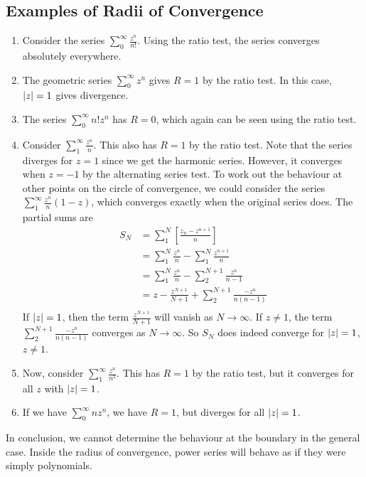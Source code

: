 \subsection{Examples of Radii of Convergence}
\begin{enumerate}
	\item Consider the series \(\sum_0^\infty \frac{z^n}{n!}\).
	      Using the ratio test, the series converges absolutely everywhere.
	\item The geometric series \(\sum_0^\infty z^n\) gives \(R=1\) by the ratio test.
	      In this case, \(\abs{z} = 1\) gives divergence.
	\item The series \(\sum_0^\infty n!z^n\) has \(R=0\), which again can be seen using the ratio test.
	\item Consider \(\sum_1^\infty \frac{z^n}{n}\).
	      This also has \(R = 1\) by the ratio test.
	      Note that the series diverges for \(z=1\) since we get the harmonic series.
	      However, it converges when \(z = -1\) by the alternating series test.
	      To work out the behaviour at other points on the circle of convergence, we could consider the series \(\sum_1^\infty \frac{z^n}{n}(1-z)\), which converges exactly when the original series does.
	      The partial sums are
	      \begin{align*}
		      S_N & = \sum_1^N \left[ \frac{z_n - z^{n+1}}{n} \right]            \\
		          & = \sum_1^N \frac{z^n}{n} - \sum_1^N \frac{z^{n+1}}{n}        \\
		          & = \sum_1^N \frac{z^n}{n} - \sum_2^{N+1} \frac{z^n}{n-1}      \\
		          & = z - \frac{z^{N+1}}{N+1} + \sum_2^{N+1} \frac{-z^n}{n(n-1)} \\
	      \end{align*}
	      If \(\abs{z} = 1\), then the term \(\frac{z^{N+1}}{N+1}\) will vanish as \(N \to \infty\).
	      If \(z \neq 1\), the term \(\sum_2^{N+1} \frac{-z^n}{n(n-1)}\) converges as \(N \to \infty\).
	      So \(S_N\) does indeed converge for \(\abs{z} = 1\), \(z \neq 1\).
	\item Now, consider \(\sum_1^\infty \frac{z^n}{n^2}\).
	      This has \(R=1\) by the ratio test, but it converges for all \(z\) with \(\abs{z} = 1\).
	\item If we have \(\sum_0^\infty nz^n\), we have \(R=1\), but diverges for all \(\abs{z} = 1\).
\end{enumerate}
\noindent In conclusion, we cannot determine the behaviour at the boundary in the general case.
Inside the radius of convergence, power series will behave as if they were simply polynomials.
